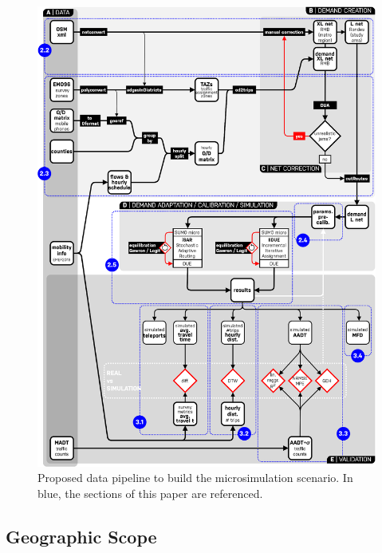 \begin{figure}[htbp!]
    \centering
    \includegraphics[width=1\textwidth]{fig_01.png}
    \caption{Proposed data pipeline to build the microsimulation scenario. In blue, the sections of this paper are referenced.}
   \label{fig:getting_real_01_diagram}
\end{figure}

\subsection{Geographic Scope}


